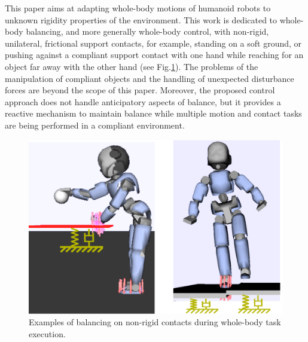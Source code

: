 \documentclass[letterpaper, 10 pt, conference]{ieeeconf}  %
\begin{document}
This paper aims at adapting whole-body motions of humanoid robots to unknown rigidity properties of the environment. This work is dedicated to whole-body balancing, and more generally whole-body control, with non-rigid, unilateral, frictional support contacts, for example, standing on a soft ground, or pushing against a compliant support contact with one hand while reaching for an object far away with the other hand (see Fig.\ref{reaching}). The problems of the manipulation of compliant objects and the handling of unexpected disturbance forces are beyond the scope of this paper. Moreover, the proposed control approach does not handle anticipatory aspects of balance, but it provides a reactive 
mechanism to maintain balance while multiple motion and contact tasks are being performed in a compliant environment.
\begin{figure}[!t]
\centering
\vspace{5pt}
\includegraphics[width=.8\linewidth]{../figure/scenario.pdf}
\caption{Examples of balancing on non-rigid contacts during whole-body task execution.}
\label{reaching}
\end{figure}
\end{document}
